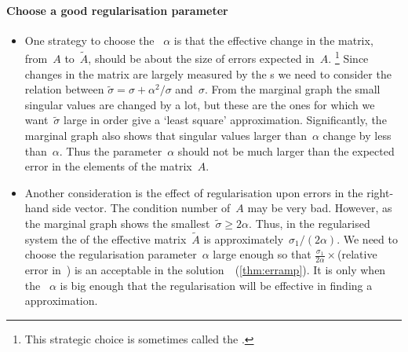 \paragraph{Choose a good regularisation parameter}
\begin{itemize}
\item One strategy to choose the ~\(\alpha\) is that the effective change in the matrix, from~\(A\) to~\(\tilde A\), should be about the size of errors expected in~\(A\).%
\footnote{This strategic choice is sometimes called the  \cite[\S7]{Kress2015}.}
Since changes in the matrix are largely measured by the s we need to consider the relation between \(\tilde\sigma=\sigma+\alpha^2/\sigma\) and~\(\sigma\).
From the marginal graph the small singular values are changed by a lot, but these are the ones for which we want~\(\tilde\sigma\) large in order give a `least square' approximation.
Significantly, the marginal graph also shows that singular values larger than~\(\alpha\) change by less than~\(\alpha\).
Thus the parameter~\(\alpha\) should not be much larger than the expected error in the elements of the matrix~\(A\).

\item Another consideration is the effect of regularisation upon errors in the right-hand side vector.
The condition number of~\(A\) may be very bad.
However, as the marginal graph shows the smallest~\(\tilde\sigma\geq2\alpha\).
Thus, in the regularised system the  of the effective matrix~\(\tilde A\) is approximately~\(\sigma_1/(2\alpha)\).
We need to choose the regularisation parameter~\(\alpha\) large enough so that \(\frac{\sigma_1}{2\alpha}\times\)(relative error in~\bv) is an acceptable  in the solution~\xv\ (\autoref{thm:erramp}).
It is only when the ~\(\alpha\) is big enough that the regularisation will be effective in finding a  approximation. 

\end{itemize}


